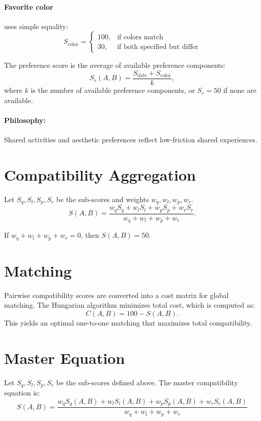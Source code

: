 \documentclass[11pt]{article}
\begin{document}
\paragraph{Favorite color} uses simple equality:
\[
S_{\text{color}} = \begin{cases}100, & \text{if colors match} \\ 30, & \text{if both specified but differ}\end{cases}
\]

The preference score is the average of available preference components:
\[
S_r(A,B) = \frac{S_{\text{date}} + S_{\text{color}}}{k},
\]
where $k$ is the number of available preference components, or $S_r=50$ if none are available.

\paragraph{Philosophy:} Shared activities and aesthetic preferences reflect low-friction shared experiences.

\section{Compatibility Aggregation}
Let $S_q, S_l, S_p, S_r$ be the sub-scores and weights $w_q, w_l, w_p, w_r$.
\[
S(A,B) = \frac{w_q S_q + w_l S_l + w_p S_p + w_r S_r}{w_q + w_l + w_p + w_r}.
\]

If $w_q + w_l + w_p + w_r = 0$, then $S(A,B) = 50$.

\section{Matching}
Pairwise compatibility scores are converted into a cost matrix for global matching. The Hungarian algorithm minimizes total cost, which is computed as:
\[
C(A,B) = 100 - S(A,B).
\]
This yields an optimal one-to-one matching that maximizes total compatibility.

\section{Master Equation}
Let $S_q, S_l, S_p, S_r$ be the sub-scores defined above. The master compatibility equation is:
\[
\boxed{\displaystyle S(A,B) = \frac{w_q S_q(A,B) + w_l S_l(A,B) + w_p S_p(A,B) + w_r S_r(A,B)}{w_q + w_l + w_p + w_r}}
\]
\end{document}
